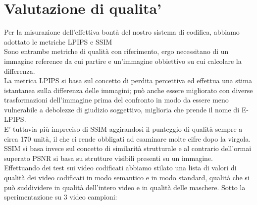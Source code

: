 \chapter{Valutazione di qualita'}
\label{chap:quality}
Per la misurazione dell'effettiva bontà del nostro sistema di codifica, abbiamo adottato le metriche LPIPS e SSIM \\
Sono entrambe metriche di qualità con riferimento, ergo necessitano di un immagine reference da cui partire e un'immagine obbiettivo su cui calcolare la differenza.\\
La metrica LPIPS si basa sul concetto di perdita percettiva ed effettua una stima istantanea sulla differenza delle immagini; può anche essere migliorato con diverse trasformazioni dell'immagine prima del confronto in modo da essere meno vulnerabile a debolezze di giudizio soggettivo, miglioria che prende il nome di E-LPIPS. \\
E' tuttavia più impreciso di SSIM aggirandosi il punteggio di qualità sempre a circa 170 unità, il che ci rende obbligati ad esaminare molte cifre dopo la virgola.\\
SSIM si basa invece sul concetto di similarità strutturale e al contrario dell'ormai superato PSNR si basa su strutture visibili presenti su un immagine. \\
Effettuando dei test sui video codificati abbiamo stilato una lista di valori di qualità dei video codificati in modo semantico e in modo standard, qualità che si può suddividere in qualità dell'intero video e in qualità delle maschere. Sotto la sperimentazione su 3 video campioni: